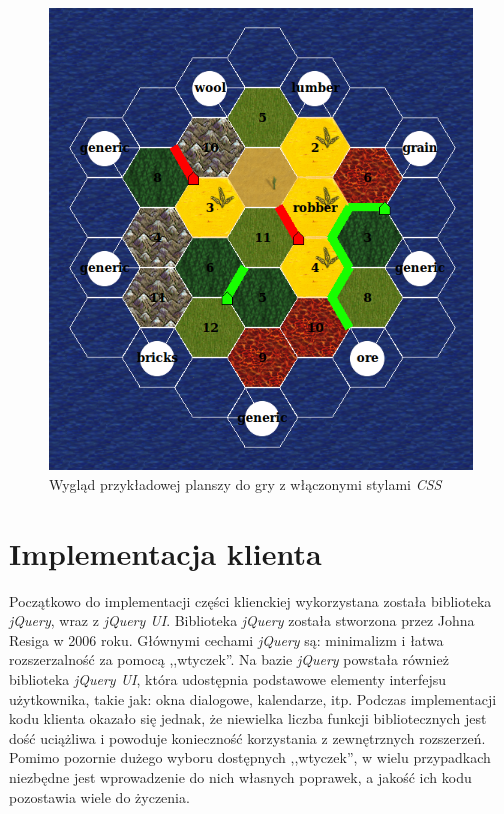 \documentclass[a4paper,12pt]{article}
\begin{document}
\begin{figure}[ht]
  \begin{center}
    \includegraphics[width=\linewidth]{board.png}
  \end{center}
  \caption{Wygląd przykładowej planszy do gry z włączonymi stylami
    \emph{CSS}}
  \label{fig:board}
\end{figure}

\clearpage

\section{Implementacja klienta}

Początkowo do implementacji części klienckiej wykorzystana została
biblioteka \emph{jQuery}, wraz z \emph{jQuery UI}. Biblioteka
\emph{jQuery} została stworzona przez Johna Resiga w 2006
roku. Głównymi cechami \emph{jQuery} są: minimalizm i łatwa
rozszerzalność za pomocą ,,wtyczek''. Na bazie \emph{jQuery} powstała
również biblioteka \emph{jQuery UI}, która udostępnia podstawowe
elementy interfejsu użytkownika, takie jak: okna dialogowe,
kalendarze, itp. Podczas implementacji kodu klienta okazało się
jednak, że niewielka liczba funkcji bibliotecznych jest dość uciążliwa
i powoduje konieczność korzystania z zewnętrznych rozszerzeń. Pomimo
pozornie dużego wyboru dostępnych ,,wtyczek'', w wielu przypadkach
niezbędne jest wprowadzenie do nich własnych poprawek, a jakość ich
kodu pozostawia wiele do życzenia.
\end{document}
